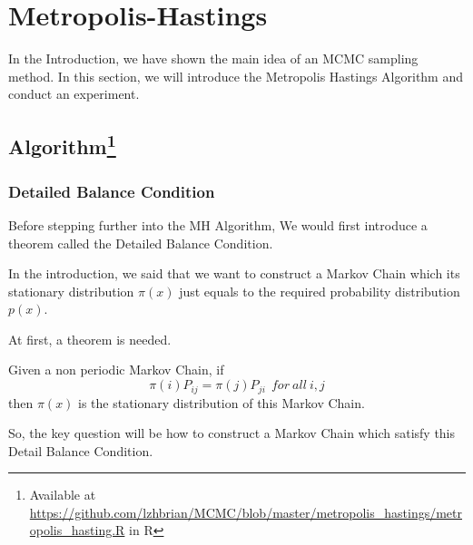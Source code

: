 
\section{Metropolis-Hastings} \label{sec:metropolis_hastings}
In the Introduction, we have shown the main idea of an MCMC sampling method. In this section, we will introduce the Metropolis Hastings Algorithm and conduct an experiment.



\subsection{Algorithm\protect\footnote{Available at \protect\url{https://github.com/lzhbrian/MCMC/blob/master/metropolis_hastings/metropolis_hasting.R} in R\cite{R}}}

\subsubsection{Detailed Balance Condition}
Before stepping further into the MH Algorithm, We would first introduce a theorem called the Detailed Balance Condition. 

In the introduction, we said that we want to construct a Markov Chain which its stationary distribution $\pi(x)$ just equals to the required probability distribution $p(x)$.

At first, a theorem is needed.
\begin{theorem} \label{theo:detail_balance_condition}
Given a non periodic Markov Chain, if 
\begin{equation} 
\pi(i) P_{ij} = \pi(j) P_{ji}~~for~all~i,j 
\end{equation}
then $\pi(x)$ is the stationary distribution of this Markov Chain.
\end{theorem}
So, the key question will be how to construct a Markov Chain which satisfy this Detail Balance Condition.

